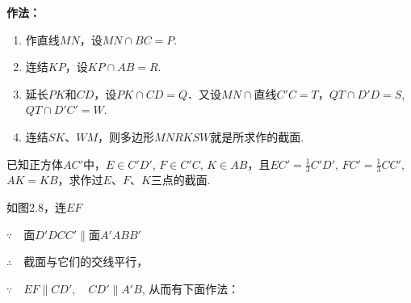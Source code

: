\begin{solution}
\textbf{作法：}
\begin{enumerate}[(1)]
\item 作直线$MN$，设$MN\cap BC=P$.
\item 连结$KP$，设$KP\cap AB=R$.
\item 延长$PK$和$CD$，设$PK\cap CD=Q$．又设$MN\cap $直线$C'C=T$，$QT\cap D'D=S$, $QT\cap D'C'=W$.
\item 连结$SK$、$WM$，则多边形$MNRKSW$就是所求作的截面.
\end{enumerate}
\end{solution}



\noindent
\begin{minipage}{.53\textwidth}\CTEXindent

\begin{example}
    已知正方体$AC'$中，$E\in C'D'$, $F\in C'C$, $K\in AB$，且$EC'=\frac{1}{3}C'D'$, $FC'=\frac{1}{3}CC'$, $AK=KB$，求作过$E$、$F$、$K$三点的截面.
\end{example}

\begin{analyze}
    如图2.8，连$EF$
    
$\because\quad $面$D'DCC'\parallel $面$A'ABB'$

$\therefore\quad $截面与它们的交线平行，

$\because\quad EF\parallel CD',\quad CD'\parallel A'B$, 从而有下面作法：
\end{analyze}
\end{minipage}
\hfill
